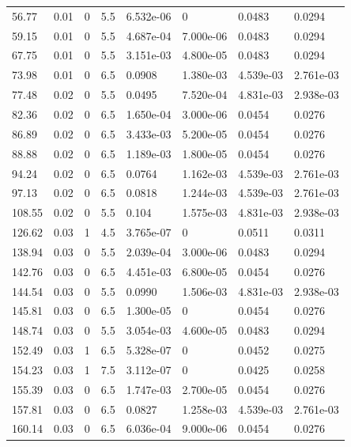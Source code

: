 \documentclass[preview]{standalone}
\begin{document}
{{\begin{tabular}{L{1.2cm}C{1.2cm} C{0.3cm}C{0.5cm} C{1.4cm}C{1.4cm} C{1.4cm}C{1.4cm}}
  56.77  &  0.01  & 0     & 5.5 &  6.532e-06  & 0  & 0.0483 &  0.0294   \\ 
  59.15  &  0.01  & 0     & 5.5 &  4.687e-04  & 7.000e-06  & 0.0483 &  0.0294   \\ 
  67.75  &  0.01  & 0     & 5.5 &  3.151e-03  & 4.800e-05  & 0.0483 &  0.0294   \\ 
  73.98  &  0.01  & 0     & 6.5 &  0.0908  & 1.380e-03  & 4.539e-03 &  2.761e-03   \\ 
  77.48  &  0.02  & 0     & 5.5 &  0.0495  & 7.520e-04  & 4.831e-03 &  2.938e-03   \\ 
  82.36  &  0.02  & 0     & 6.5 &  1.650e-04  & 3.000e-06  & 0.0454 &  0.0276   \\ 
  86.89  &  0.02  & 0     & 6.5 &  3.433e-03  & 5.200e-05  & 0.0454 &  0.0276   \\ 
  88.88  &  0.02  & 0     & 6.5 &  1.189e-03  & 1.800e-05  & 0.0454 &  0.0276   \\ 
  94.24  &  0.02  & 0     & 6.5 &  0.0764  & 1.162e-03  & 4.539e-03 &  2.761e-03   \\ 
  97.13  &  0.02  & 0     & 6.5 &  0.0818  & 1.244e-03  & 4.539e-03 &  2.761e-03   \\ 
  108.55  &  0.02  & 0     & 5.5 &  0.104  & 1.575e-03  & 4.831e-03 &  2.938e-03   \\ 
  126.62  &  0.03  & 1     & 4.5 &  3.765e-07  & 0  & 0.0511 &  0.0311   \\ 
  138.94  &  0.03  & 0     & 5.5 &  2.039e-04  & 3.000e-06  & 0.0483 &  0.0294   \\ 
  142.76  &  0.03  & 0     & 6.5 &  4.451e-03  & 6.800e-05  & 0.0454 &  0.0276   \\ 
  144.54  &  0.03  & 0     & 5.5 &  0.0990  & 1.506e-03  & 4.831e-03 &  2.938e-03   \\ 
  145.81  &  0.03  & 0     & 6.5 &  1.300e-05  & 0  & 0.0454 &  0.0276   \\ 
  148.74  &  0.03  & 0     & 5.5 &  3.054e-03  & 4.600e-05  & 0.0483 &  0.0294   \\ 
  152.49  &  0.03  & 1     & 6.5 &  5.328e-07  & 0  & 0.0452 &  0.0275   \\ 
  154.23  &  0.03  & 1     & 7.5 &  3.112e-07  & 0  & 0.0425 &  0.0258   \\ 
  155.39  &  0.03  & 0     & 6.5 &  1.747e-03  & 2.700e-05  & 0.0454 &  0.0276   \\ 
  157.81  &  0.03  & 0     & 6.5 &  0.0827  & 1.258e-03  & 4.539e-03 &  2.761e-03   \\ 
  160.14  &  0.03  & 0     & 6.5 &  6.036e-04  & 9.000e-06  & 0.0454 &  0.0276   \\ 

\end{tabular}}}
\end{document}
